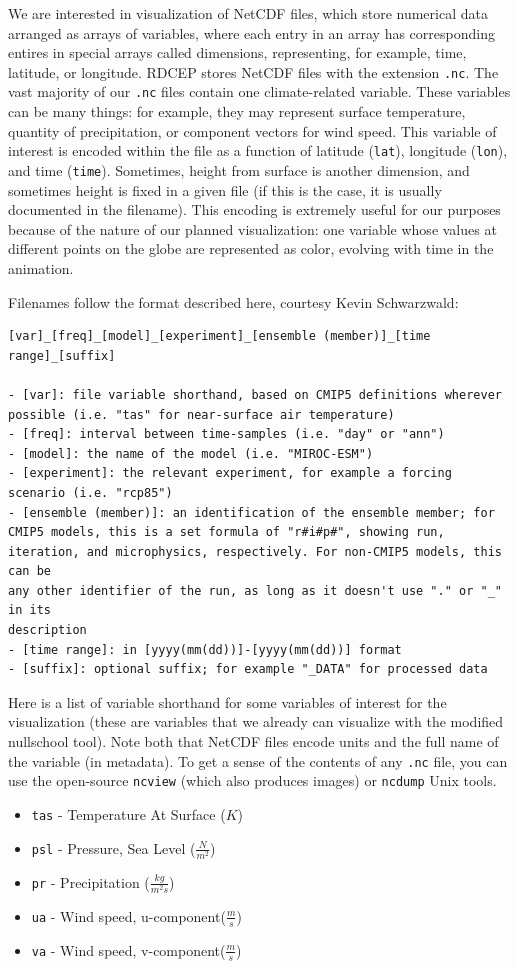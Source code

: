 \documentclass{article}
\begin{document}
We are interested in visualization of NetCDF files, which store numerical data arranged as arrays of variables, where each entry in an array has corresponding entires in special arrays called dimensions, representing, for example, time, latitude, or longitude. RDCEP stores NetCDF files with the extension \texttt{.nc}. The vast majority of our \texttt{.nc} files contain one climate-related variable. These variables can be many things: for example, they may represent surface temperature, quantity of precipitation, or component vectors for wind speed. This variable of interest is encoded within the file as a function of latitude (\texttt{lat}), longitude (\texttt{lon}), and time (\texttt{time}). Sometimes, height from surface is another dimension, and sometimes height is fixed in a given file (if this is the case, it is usually documented in the filename). This encoding is extremely useful for our purposes because of the nature of our planned visualization: one variable whose values at different points
on the globe are represented as color, evolving with time in the animation.

Filenames follow the format described here, courtesy Kevin Schwarzwald:
\begin{verbatim}
[var]_[freq]_[model]_[experiment]_[ensemble (member)]_[time range]_[suffix] 

- [var]: file variable shorthand, based on CMIP5 definitions wherever
possible (i.e. "tas" for near-surface air temperature)
- [freq]: interval between time-samples (i.e. "day" or "ann")
- [model]: the name of the model (i.e. "MIROC-ESM")
- [experiment]: the relevant experiment, for example a forcing
scenario (i.e. "rcp85")
- [ensemble (member)]: an identification of the ensemble member; for
CMIP5 models, this is a set formula of "r#i#p#", showing run,
iteration, and microphysics, respectively. For non-CMIP5 models, this can be
any other identifier of the run, as long as it doesn't use "." or "_" in its
description
- [time range]: in [yyyy(mm(dd))]-[yyyy(mm(dd))] format
- [suffix]: optional suffix; for example "_DATA" for processed data
\end{verbatim}
Here is a list of variable shorthand for some variables of interest for the visualization (these are variables that we already can visualize with the modified nullschool tool). Note both that NetCDF files encode units and the full name of the variable (in metadata). To get a sense of the contents of any \texttt{.nc} file, you can use the open-source \texttt{ncview} (which also produces images) or \texttt{ncdump} Unix tools.
\begin{itemize}
    \item \texttt{tas} - Temperature At Surface ($K$)
    \item \texttt{psl} - Pressure, Sea Level ($\frac{N}{m^2}$)
    \item \texttt{pr} - Precipitation ($\frac{kg}{m^{2} s}$)
    \item \texttt{ua} - Wind speed, u-component($\frac{m}{s}$)
    \item \texttt{va} - Wind speed, v-component($\frac{m}{s}$)
\end{itemize}
\end{document}

